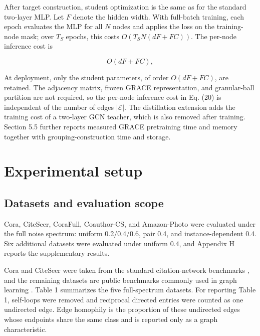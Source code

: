 \documentclass[preprint,12pt]{elsarticle}
\begin{document}
After target construction, student optimization is the same as for the standard two-layer MLP. Let \(F\) denote the hidden width. With full-batch training, each epoch evaluates the MLP for all \(N\) nodes and applies the loss on the training-node mask; over \(T_{S}\) epochs, this costs \(O(T_{S}N(dF + FC))\). The per-node inference cost is

\begin{equation}\label{eq:20}
O(dF + FC),
\end{equation}

At deployment, only the student parameters, of order \(O(dF + FC)\), are retained. The adjacency matrix, frozen GRACE representation, and granular-ball partition are not required, so the per-node inference cost in Eq. (20) is independent of the number of edges \(|\mathcal{E}|\). The distillation extension adds the training cost of a two-layer GCN teacher, which is also removed after training. Section 5.5 further reports measured GRACE pretraining time and memory together with grouping-construction time and storage.

\Needspace{397pt}

\FloatBarrier

\section{Experimental setup}\label{sec:4}

\Needspace{397pt}

\subsection{Datasets and evaluation scope}\label{sec:4.1}

Cora, CiteSeer, CoraFull, Coauthor-CS, and Amazon-Photo were evaluated under the full noise spectrum: uniform 0.2/0.4/0.6, pair 0.4, and instance-dependent 0.4. Six additional datasets were evaluated under uniform 0.4, and Appendix H reports the supplementary results.

Cora and CiteSeer were taken from the standard citation-network benchmarks \cite{ref38}, and the remaining datasets are public benchmarks commonly used in graph learning \cite{ref39}. Table 1 summarizes the five full-spectrum datasets. For reporting Table 1, self-loops were removed and reciprocal directed entries were counted as one undirected edge. Edge homophily is the proportion of these undirected edges whose endpoints share the same class and is reported only as a graph characteristic.
\end{document}
